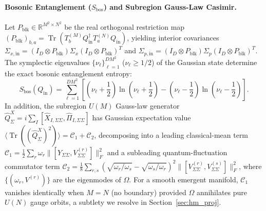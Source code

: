 \documentclass[11pt,a4paper]{article}
\DeclareMathOperator{\Tr}{Tr}
\begin{document}
\paragraph{Bosonic Entanglement ($S_{\mathrm{bos}}$) and Subregion Gauss-Law Casimir.}
Let $P_{\mathrm{blk}} \in \mathbb{R}^{M^2 \times N^2}$ be the real orthogonal restriction map $(P_{\mathrm{blk}})_{b,a} = \Tr(T^{(M)}_b Q_{\mathrm{in}}^\dagger T^{(N)}_a Q_{\mathrm{in}})$, yielding interior covariances $\Sigma_{x,\mathrm{in}} = (I_D\otimes P_{\mathrm{blk}})\Sigma_x(I_D\otimes P_{\mathrm{blk}})^T$ and $\Sigma_{p,\mathrm{in}} = (I_D\otimes P_{\mathrm{blk}})\Sigma_p(I_D\otimes P_{\mathrm{blk}})^T$. The symplectic eigenvalues $\{\nu_\ell\}_{\ell=1}^{DM^2}$ ($\nu_\ell \ge 1/2$) of the Gaussian state determine the exact bosonic entanglement entropy:
\begin{equation}
  S_{\mathrm{bos}}(Q_{\mathrm{in}}) = \sum_{\ell=1}^{DM^2} \left[\left(\nu_\ell + \frac{1}{2}\right)\ln\!\left(\nu_\ell + \frac{1}{2}\right) - \left(\nu_\ell - \frac{1}{2}\right)\ln\!\left(\nu_\ell - \frac{1}{2}\right)\right].
  \label{eq:Sbos}
\end{equation}
In addition, the subregion $U(M)$ Gauss-law generator $\hat{Q}^X_\Sigma = i \sum_I [\hat{X}_{I,\Sigma\Sigma}, \hat{\Pi}_{I,\Sigma\Sigma}]$ has Gaussian expectation value $\langle \Tr((\hat{Q}^X_\Sigma)^2)\rangle = \mathcal{C}_1 + \mathcal{C}_2$, decomposing into a leading classical-mean term $\mathcal{C}_1 = \frac{1}{2}\sum_r \omega_r \|[Y_{\Sigma\Sigma}, V^{(r)}_{\Sigma\Sigma}]\|_F^2$ and a subleading quantum-fluctuation commutator term $\mathcal{C}_2 = \frac{1}{8}\sum_{r,s}(\sqrt{\omega_r/\omega_s} - \sqrt{\omega_s/\omega_r})^2 \|[V^{(r)}_{\Sigma\Sigma}, V^{(s)}_{\Sigma\Sigma}]\|_F^2$, where $\{(\omega_r, V^{(r)})\}$ are the eigenmodes of $\Omega$. For a smooth emergent manifold, $\mathcal{C}_1$ vanishes identically when $M=N$ (no boundary) provided $\Omega$ annihilates pure $U(N)$ gauge orbits, a subtlety we resolve in Section~\ref{sec:hm_proj}.
\end{document}
